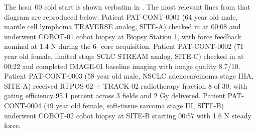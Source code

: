 The hour 00 cold start is shown verbatim in
.
The most relevant lines from that diagram are reproduced below. Patient
PAT-CONT-0001 (64 year old male, mantle cell lymphoma TRAVERSE analog,
SITE-A) checked in at 00:08 and underwent COBOT-01 cobot biopsy at
Biopsy Station 1, with force feedback nominal at 1.4 N during the 6-
core acquisition. Patient PAT-CONT-0002 (71 year old female, limited
stage SCLC STREAM analog, SITE-C) checked in at 00:22 and completed
IMAGE-01 baseline imaging with image quality 8.7/10. Patient
PAT-CONT-0003 (58 year old male, NSCLC adenocarcinoma stage IIIA,
SITE-A) received RTPOS-02 + TRACK-02 radiotherapy fraction 8 of 30,
with gating efficiency 95.1 percent across 3 fields and 2 Gy
delivered. Patient PAT-CONT-0004 (49 year old female, soft-tissue
sarcoma stage III, SITE-B) underwent COBOT-02 cobot biopsy at SITE-B
starting 00:57 with 1.6 N steady force.

